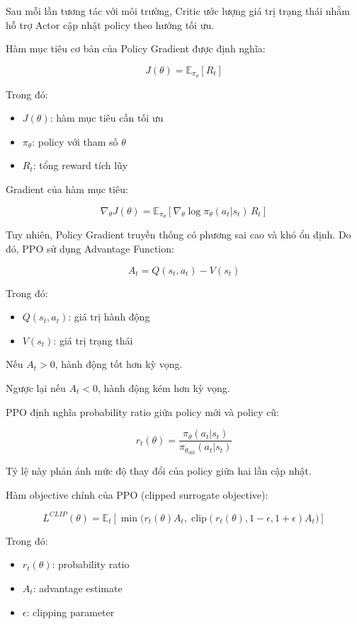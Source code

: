 Sau mỗi lần tương tác với môi trường, Critic ước lượng giá trị trạng thái nhằm hỗ trợ Actor cập nhật policy theo hướng tối ưu.

Hàm mục tiêu cơ bản của Policy Gradient được định nghĩa:

\[
J(\theta) = \mathbb{E}_{\pi_\theta}[R_t]
\]

Trong đó:
\begin{itemize}
    \item $J(\theta)$: hàm mục tiêu cần tối ưu
    \item $\pi_\theta$: policy với tham số $\theta$
    \item $R_t$: tổng reward tích lũy
\end{itemize}

Gradient của hàm mục tiêu:

\[
\nabla_\theta J(\theta)
= \mathbb{E}_{\pi_\theta}\left[\nabla_\theta \log \pi_\theta(a_t|s_t)\, R_t \right]
\]

Tuy nhiên, Policy Gradient truyền thống có phương sai cao và khó ổn định. Do đó, PPO sử dụng Advantage Function:

\[
A_t = Q(s_t, a_t) - V(s_t)
\]

Trong đó:
\begin{itemize}
    \item $Q(s_t, a_t)$: giá trị hành động
    \item $V(s_t)$: giá trị trạng thái
\end{itemize}

Nếu $A_t > 0$, hành động tốt hơn kỳ vọng.

Ngược lại nếu $A_t < 0$, hành động kém hơn kỳ vọng.

PPO định nghĩa probability ratio giữa policy mới và policy cũ:

\[
r_t(\theta) =
\frac{\pi_\theta(a_t|s_t)}{\pi_{\theta_{\text{old}}}(a_t|s_t)}
\]

Tỷ lệ này phản ánh mức độ thay đổi của policy giữa hai lần cập nhật.

Hàm objective chính của PPO (clipped surrogate objective):

\[
L^{CLIP}(\theta)
=
\mathbb{E}_t \left[
\min \Big(
r_t(\theta) A_t,\;
\text{clip}(r_t(\theta), 1-\epsilon, 1+\epsilon) A_t
\Big)
\right]
\]

Trong đó:
\begin{itemize}
    \item $r_t(\theta)$: probability ratio
    \item $A_t$: advantage estimate
    \item $\epsilon$: clipping parameter
\end{itemize}

